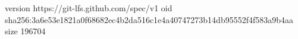 version https://git-lfs.github.com/spec/v1
oid sha256:3a6e53e1821a0f68682ec4b2da516c1e4a40747273b14db95552f4f583a9b4aa
size 196704
